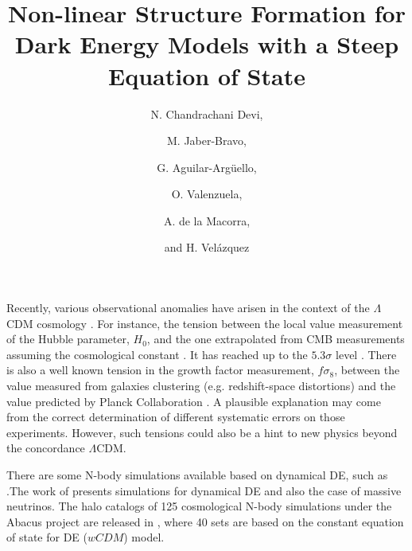 \documentclass[a4paper,11pt]{article}
\begin{document}
Recently, various observational anomalies have arisen in the context of the $\Lambda$CDM cosmology \cite{Raveri:2015maa,Macaulay:2013swa}. 
For instance, the tension between the local value measurement of the Hubble parameter, $H_0$, and the one extrapolated from CMB measurements assuming the cosmological constant \cite{Aghanim:2018eyx}. 
It has reached up to the $5.3\sigma$ level \cite{Wong:2019kwg}. 
There is also a well known tension in the growth factor measurement, $f\sigma_{8}$, between the value measured from galaxies clustering (e.g. redshift-space distortions) and the value predicted by Planck Collaboration \cite{Macaulay:2013swa}. 
A plausible explanation may come from the correct determination of different systematic errors on those experiments. However, such tensions could also be a hint to new physics beyond the concordance $\Lambda$CDM.

There are some N-body simulations available based on dynamical DE, such as \cite{Lawrence+2017,Garrison:2017ssz, Almaraz:2019zxy}.The work of \cite{Rizzo:2016mdr} presents simulations for dynamical DE and also the case of massive neutrinos. The halo catalogs of 125 cosmological N-body simulations under the Abacus project are released in \cite{Garrison:2017ssz}, where 40 sets are based on the constant equation of state for DE ($wCDM$) model.

\usepackage{jcappub} %

\usepackage[T1]{fontenc} %

\title{Non-linear Structure Formation for Dark Energy Models with a Steep Equation of State}

\author[a,b,c]{N. Chandrachani Devi,}
\author[b,d]{M. Jaber-Bravo,}
\author[a]{G. Aguilar-Arg\"uello,}
\author[a]{O. Valenzuela,}
\author[b]{A. de la Macorra,}
\author[a]{and H. Vel\'azquez}


\end{document}
